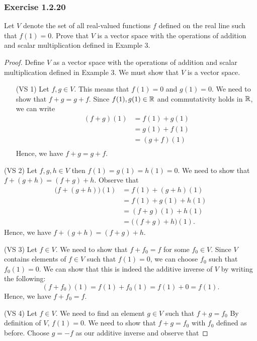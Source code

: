 \subsubsection{Exercise 1.2.20} Let \( V  \) denote the set of all real-valued functions \( f  \) defined on the real line such that \( f(1) = 0  \). Prove that \( V  \) is a vector space with the operations of addition and scalar multiplication defined in Example 3.
\begin{proof} 
    Define \( V  \) as a vector space with the operations of addition and scalar multiplication defined in Example 3. We must show that \( V  \) is a vector space.
\begin{enumerate}
\item[(VS 1)] Let \( f,g \in V  \). This means that \( f(1) = 0  \) and \( g(1) = 0 \). We need to show that \( f+ g = g + f  \). Since \( f(1), g(1) \in \mathbb{R}  \) and commutativity holds in \( \mathbb{R}  \), we can write
    \begin{align*}
        (f+g)(1)   &= f(1) + g(1) \\
                   &= g(1) + f(1) \\
                   &= (g+f)(1) \\
    \end{align*}
    Hence, we have \( f+g = g+f \).
\end{enumerate}
\item[(VS 2)] Let \( f,g,h \in V  \) then \( f(1) = g(1) = h(1) = 0  \). We need to show that \( f + (g+h) = (f+g) + h  \). Observe that  
    \begin{align*}
       \Big( f + (g+h)  \Big)(1)  &=  f(1) + (g+h)(1) \\
                       &= f(1) + g(1) + h(1) \\
                       &= (f+g)(1) + h(1) \\
                       &= \Big( (f+g) + h \Big)(1).
    \end{align*}
    Hence, we have \( f + (g+h) = (f+g) + h \).
\item[(VS 3)]  Let \( f \in V  \). We need to show that \( f + f_{0} = f  \) for some \( f_{0} \in V  \). Since \( V  \) contains elements of \( f \in V  \) such that \( f(1) = 0  \), we can choose \( f_{0} \) such that \( f_{0}(1) = 0  \). We can show that this is indeed the additive inverse of \( V  \) by writing the following: 
    \[  (f + f_{0})(1) = f(1) + f_{0}(1) = f(1) + 0 = f(1).  \]
    Hence, we have \( f + f_{0} = f \).
\item[(VS 4)] Let \( f \in V  \). We need to find an element \( g \in V  \) such that \( f + g = f_{0} \) By definition of \( V  \), \( f(1) = 0  \).  We need to show that \( f+ g = f_{0} \) with \( f_{0}  \) defined as before. Choose \( g = -f  \) as our additive inverse and observe that  

\end{proof}
